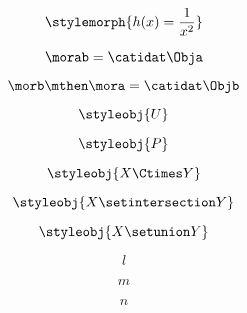 \begin{forslides}
        \begin{equation}
            \label{eq:semicats-slides-30}
            \stylemorph{h(x) = \frac{1}{x^2}}
        \end{equation}

        \begin{equation}
            \label{eq:semicats-slides-31}
            \morab = \catidat\Obja
        \end{equation}

        \begin{equation}
            \label{eq:semicats-slides-32}
            \morb \mthen \mora = \catidat\Objb
        \end{equation}

        \begin{equation}
            \label{eq:semicats-slides-33}
            \styleobj{U}
        \end{equation}

        \begin{equation}
            \label{eq:semicats-slides-34}
            \styleobj{P}
        \end{equation}

        \begin{equation}
            \label{eq:semicats-slides-35}
            \styleobj{X \Ctimes Y}
        \end{equation}

        \begin{equation}
            \label{eq:semicats-slides-36}
            \styleobj{X \setintersection Y}
        \end{equation}

        \begin{equation}
            \label{eq:semicats-slides-37}
            \styleobj{X \setunion Y}
        \end{equation}

        \begin{equation}
            \label{eq:semicats-slides-38}
            l
        \end{equation}

        \begin{equation}
            \label{eq:semicats-slides-39}
            m
        \end{equation}

        \begin{equation}
            \label{eq:semicats-slides-40}
            n
        \end{equation}


\end{forslides}
